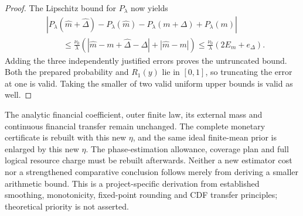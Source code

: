 \begin{proof}
The Lipschitz bound for $P_\lambda$ now yields
\begin{align*}
 &\left|P_\lambda(\widehat m+\widehat\Delta)
          -P_\lambda(\widehat m)
          -P_\lambda(m+\Delta)+P_\lambda(m)\right|\\
 &\qquad\leq\frac{\nu_0}{\lambda}
        \left(|\widehat m-m+\widehat\Delta-\Delta|
              +|\widehat m-m|\right)
 \leq\frac{\nu_0}{\lambda}(2E_m+e_\Delta).
\end{align*}
Adding the three independently justified errors proves the untruncated
bound. Both the prepared probability and $R_1(y)$ lie in $[0,1]$, so
truncating the error at one is valid. Taking the smaller of two valid
uniform upper bounds is valid as well.
\end{proof}

The analytic financial coefficient, outer finite law, its external mass
and continuous financial transfer remain unchanged. The complete monetary
certificate is rebuilt with this new $\eta$, and the same ideal finite-mean
prior is enlarged by this new $\eta$. The phase-estimation allowance,
coverage plan and full logical resource charge must be rebuilt afterwards.
Neither a new estimator cost nor a strengthened comparative conclusion
follows merely from deriving a smaller arithmetic bound. This is a
project-specific derivation from established smoothing, monotonicity,
fixed-point rounding and CDF transfer principles; theoretical priority is
not asserted.
